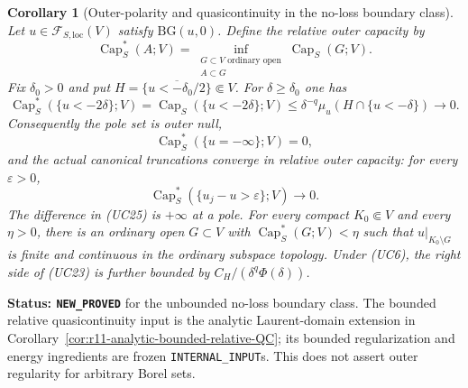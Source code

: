\documentclass[11pt,a4paper]{article}
\numberwithin{equation}{section}
\newtheorem{corollary}[theorem]{Corollary}
\theoremstyle{definition}
\theoremstyle{remark}
\begin{document}
\begin{corollary}[Outer-polarity and quasicontinuity in the no-loss boundary class]
\label{cor:r11-unbounded-outer-quasicontinuity}
Let $u\in\mathcal F_{S,\mathrm{loc}}(V)$ satisfy
$\mathrm{BG}(u,0)$. Define the relative outer capacity by
\[
 \operatorname{Cap}_S^*(A;V)
     =\inf_{\substack{G\subset V\text{ ordinary open}\\A\subset G}}
                           \operatorname{Cap}_S(G;V).
 \tag{UC22}
\]
Fix $\delta_0>0$ and put
$H=\overline{\{u<-\delta_0/2\}}\Subset V$.
For $\delta\geq\delta_0$ one has
\[
 \operatorname{Cap}_S^*(\{u<-2\delta\};V)
    =\operatorname{Cap}_S(\{u<-2\delta\};V)
    \leq \delta^{-q}\mu_u(H\cap\{u<-\delta\})
                        \longrightarrow0.
 \tag{UC23}
\]
Consequently the pole set is outer null,
\[
                 \operatorname{Cap}_S^*(\{u=-\infty\};V)=0,
 \tag{UC24}
\]
and the actual canonical truncations converge in relative outer
capacity: for every $\varepsilon>0$,
\[
       \operatorname{Cap}_S^*(\{u_j-u>\varepsilon\};V)
                                      \longrightarrow0.
 \tag{UC25}
\]
The difference in (UC25) is $+\infty$ at a pole.
For every compact $K_0\Subset V$ and every $\eta>0$, there is
an ordinary open $G\subset V$ with
$\operatorname{Cap}_S^*(G;V)<\eta$ such that
$u|_{K_0\setminus G}$ is finite and continuous in the ordinary
subspace topology. Under (UC6), the right side of (UC23) is further
bounded by $C_H/(\delta^q\Phi(\delta))$.
\end{corollary}

\noindent\textbf{Status: \texttt{NEW\_PROVED}} for the unbounded
no-loss boundary class. The bounded relative quasicontinuity input
is the analytic Laurent-domain extension in
Corollary~\ref{cor:r11-analytic-bounded-relative-QC}; its bounded
regularization and energy ingredients are frozen
\texttt{INTERNAL\_INPUT}s.
This does not assert outer regularity for arbitrary Borel sets.
\end{document}
